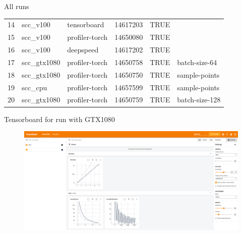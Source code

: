 \documentclass[compress,aspectratio=169]{beamer}
\begin{document}
\begin{frame}{All runs}
{\begin{table}[]
\begin{tabular}{@{}llllll@{}}
14  & scc\_v100    & tensorboard    & 14617203 & TRUE      &                \\
15  & scc\_v100    & profiler-torch & 14650080 & TRUE      &                \\
16  & scc\_v100    & deepspeed      & 14617202 & TRUE      &                \\
17  & scc\_gtx1080 & profiler-torch & 14650758 & TRUE      & batch-size-64  \\
18  & scc\_gtx1080 & profiler-torch & 14650750 & TRUE      & sample-points  \\
19  & scc\_cpu     & profiler-torch & 14657599 & TRUE      & sample-points  \\
20  & scc\_gtx1080 & profiler-torch & 14650759 & TRUE      & batch-size-128 \\ \bottomrule
\end{tabular}
\end{table}
}
\end{frame}

\begin{frame}{Tensorboard for run with GTX1080}

\begin{center}
    \begin{figure}
        \includegraphics[width=1\textwidth]{../../data/scap_gtx1080_tensorboard_14615343}
    \end{figure}
    \end{center}

\end{frame}
\end{document}
